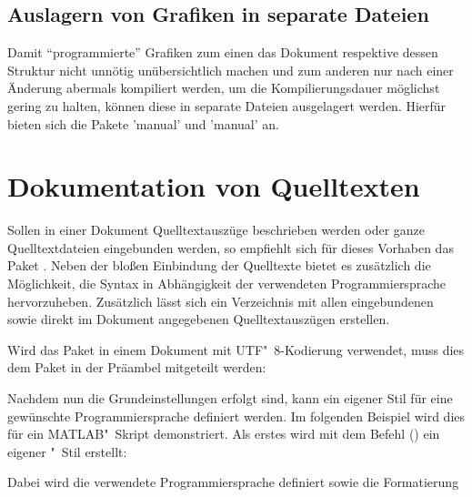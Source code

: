 \documentclass[%
  english,ngerman,%
  cdgeometry=no,DIV=12,automark,%
]{tudscrartcl}
\begin{document}
\subsection{Auslagern von Grafiken in separate Dateien}
Damit \enquote{programmierte} Grafiken zum einen das Dokument respektive dessen 
Struktur nicht unnötig unübersichtlich machen und zum anderen nur nach einer 
Änderung abermals kompiliert werden, um die Kompilierungsdauer möglichst gering 
zu halten, können diese in separate Dateien ausgelagert werden. Hierfür bieten 
sich die Pakete 'manual' und 'manual' an.



\section{Dokumentation von Quelltexten}
Sollen in einer Dokument Quelltextauszüge beschrieben werden oder ganze 
Quelltextdateien eingebunden werden, so empfiehlt sich für dieses Vorhaben das 
Paket . Neben der bloßen Einbindung der Quelltexte bietet es 
zusätzlich die Möglichkeit, die Syntax in Abhängigkeit der verwendeten 
Programmiersprache hervorzuheben. Zusätzlich lässt sich ein Verzeichnis mit 
allen eingebundenen sowie direkt im Dokument angegebenen Quelltextauszügen 
erstellen.
%
\begin{Hint}
\usepackage{listings}
\end{Hint}
%
Wird das Paket in einem Dokument mit UTF"~8-Kodierung verwendet, muss dies dem 
Paket in der Präambel mitgeteilt werden:
%
\begin{Hint}
\end{Hint}
%
Nachdem nun die Grundeinstellungen erfolgt sind, kann ein eigener Stil für eine 
gewünschte Programmiersprache definiert werden. Im folgenden Beispiel wird dies 
für ein MATLAB"~Skript demonstriert. Als erstes wird mit dem Befehl 
() ein eigener "~Stil 
erstellt:
%
\begin{Hint*}
\end{Hint*}
%
Dabei wird die verwendete Programmiersprache definiert sowie die Formatierung 
\end{document}
